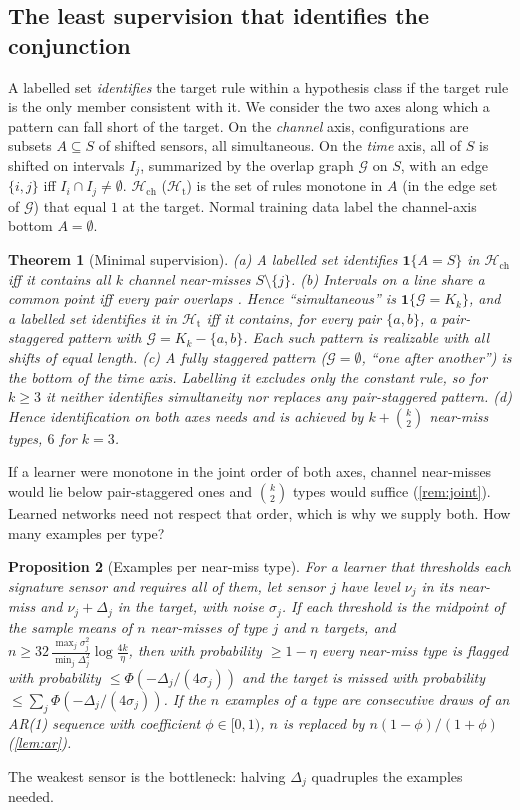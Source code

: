 \documentclass{article}
\newtheorem{theorem}{Theorem}
\newtheorem{proposition}[theorem]{Proposition}
\theoremstyle{definition}
\theoremstyle{remark}
\renewcommand{\1}{\mathbf{1}}
\begin{document}
\subsection{The least supervision that identifies the conjunction}
\label{sec:teach}
A labelled set \emph{identifies} the target rule within a hypothesis class if the target rule is the only member consistent with it. We consider the two axes along which a pattern can fall short of the target. On the \emph{channel} axis, configurations are subsets $A\subseteq S$ of shifted sensors, all simultaneous. On the \emph{time} axis, all of $S$ is shifted on intervals $I_j$, summarized by the overlap graph $\mathcal{G}$ on $S$, with an edge $\{i,j\}$ iff $I_i\cap I_j\neq\emptyset$. $\mathcal{H}_{\mathrm{ch}}$ ($\mathcal{H}_{\mathrm{t}}$) is the set of rules monotone in $A$ (in the edge set of $\mathcal{G}$) that equal $1$ at the target. Normal training data label the channel-axis bottom $A=\emptyset$.
\begin{theorem}[Minimal supervision]\label{thm:teach}
(a) A labelled set identifies $\1\{A=S\}$ in $\mathcal{H}_{\mathrm{ch}}$ iff it contains all $k$ channel near-misses $S\setminus\{j\}$.
(b) Intervals on a line share a common point iff every pair overlaps \citep{helly1923}. Hence ``simultaneous'' is $\1\{\mathcal{G}=K_k\}$, and a labelled set identifies it in $\mathcal{H}_{\mathrm{t}}$ iff it contains, for every pair $\{a,b\}$, a \emph{pair-staggered} pattern with $\mathcal{G}=K_k-\{a,b\}$. Each such pattern is realizable with all shifts of equal length.
(c) A fully staggered pattern ($\mathcal{G}=\emptyset$, ``one after another'') is the bottom of the time axis. Labelling it excludes only the constant rule, so for $k\ge3$ it neither identifies simultaneity nor replaces any pair-staggered pattern.
(d) Hence identification on both axes needs and is achieved by $k+\binom{k}{2}$ near-miss types, $6$ for $k=3$.
\end{theorem}
If a learner were monotone in the joint order of both axes, channel near-misses would lie below pair-staggered ones and $\binom k2$ types would suffice (\cref{rem:joint}). Learned networks need not respect that order, which is why we supply both. How many examples per type?

\begin{proposition}[Examples per near-miss type]\label{prop:samples}
For a learner that thresholds each signature sensor and requires all of them, let sensor $j$ have level $\nu_j$ in its near-miss and $\nu_j+\Delta_j$ in the target, with noise $\sigma_j$. If each threshold is the midpoint of the sample means of $n$ near-misses of type $j$ and $n$ targets, and $n\ge32\,\frac{\max_j\sigma_j^2}{\min_j\Delta_j^2}\log\frac{4k}{\eta}$, then with probability $\ge1-\eta$ every near-miss type is flagged with probability $\le\Phi(-\Delta_j/(4\sigma_j))$ and the target is missed with probability $\le\sum_j\Phi(-\Delta_j/(4\sigma_j))$. If the $n$ examples of a type are consecutive draws of an AR(1) sequence with coefficient $\phi\in[0,1)$, $n$ is replaced by $n(1-\phi)/(1+\phi)$ (\cref{lem:ar}).
\end{proposition}
The weakest sensor is the bottleneck: halving $\Delta_j$ quadruples the examples needed.
\end{document}
